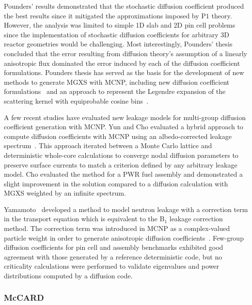 Pounders' results demonstrated that the stochastic diffusion coefficient produced the best results since it mitigated the approximations imposed by P$1$ theory. However, the analysis was limited to simple 1D slab and 2D pin cell problems since the implementation of stochastic diffusion coefficients for arbitrary 3D reactor geometries would be challenging. Most interestingly, Pounders' thesis concluded that the error resulting from diffusion theory's assumption of a linearly anisotropic flux dominated the error induced by each of the diffusion coefficient formulations. Pounders thesis has served as the basis for the development of new methods to generate \ac{MGXS} with MCNP, including new diffusion coefficient formulations~\cite{pounders2009diffusion} and an approach to represent the Legendre expansion of the scattering kernel with equiprobable cosine bins~\cite{pounders2015history}.

A few recent studies have evaluated new leakage models for multi-group diffusion coefficient generation with MCNP. Yun and Cho evaluated a hybrid approach to compute diffusion coefficients with MCNP using an albedo-corrected leakage spectrum~\cite{cho2009generation,yun2010monte}. This approach iterated between a Monte Carlo lattice and deterministic whole-core calculations to converge nodal diffusion parameters to preserve surface currents to match a criterion defined by any arbitrary leakage model. Cho evaluated the method for a \ac{PWR} fuel assembly and demonstrated a slight improvement in the solution compared to a diffusion calculation with \ac{MGXS} weighted by an infinite spectrum.

Yamamoto~\cite{yamamoto2012buckling} developed a method to model neutron leakage with a correction term in the transport equation which is equivalent to the B$_{1}$ leakage correction method. The correction term was introduced in MCNP as a complex-valued particle weight in order to generate anisotropic diffusion coefficients~\cite{yamamoto2012diff}. Few-group diffusion coefficients for pin cell and assembly benchmarks exhibited good agreement with those generated by a reference deterministic code, but no criticality calculations were performed to validate eigenvalues and power distributions computed by a diffusion code.

\subsubsection{McCARD}
\label{subsec:chap3-lit-review-diffusion-mccard}

